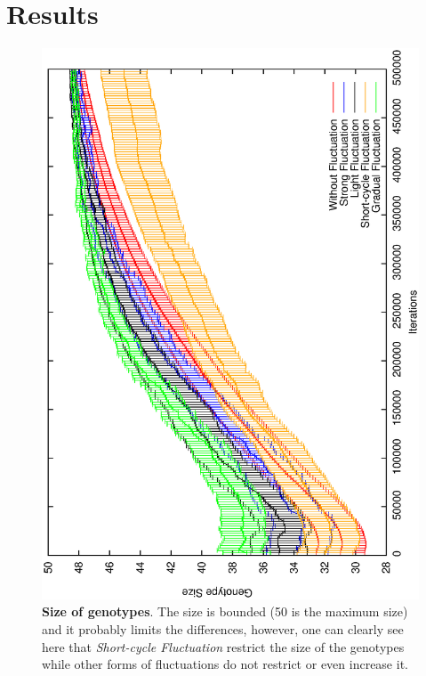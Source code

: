 \documentclass[letterpaper]{article}
\begin{document}
\section{Results}
\begin{figure}[h]
\centering
\includegraphics[width=0.7\columnwidth, angle =-90 ]{Size}
\caption{\textbf{Size of genotypes}. The size is bounded (50 is the maximum size) and  it probably limits the differences, however, one can clearly see here that \emph{Short-cycle  Fluctuation} restrict the size of the genotypes while other forms of fluctuations do not restrict or even increase it.
}
\label{Size}
\end{figure}
\end{document}
